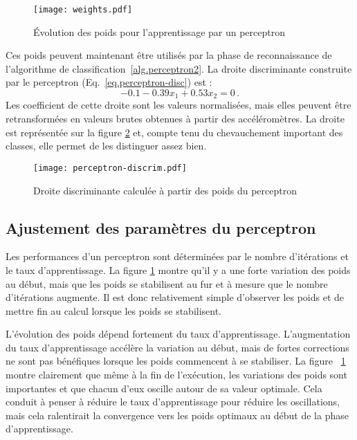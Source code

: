 \begin{figure}[bt]
\begin{center}
\texttt{[image: weights.pdf]}
\end{center}
\caption{Évolution des poids pour l'apprentissage par un perceptron}\label{fig.weights-fixeta}
\end{figure}
Ces poids peuvent maintenant être utilisés par la phase de reconnaissance de l'algorithme de classification~\ref{alg.perceptron2}. La droite discriminante construite par le perceptron (Eq.~\ref{eq.perceptron-disc}) est :
\[
-0.1 -0.39x_1 + 0.53x_2 = 0\,.
\]
Les coefficient de cette droite sont les valeurs normalisées, mais elles peuvent être retransformées en valeurs brutes obtenues à partir des accéléromètres. La droite est représentée sur la figure \ref{fig.perceptron-dis} et, compte tenu du chevauchement important des classes, elle permet de les distinguer assez bien.

\begin{figure}
\begin{center}
\texttt{[image: perceptron-discrim.pdf]}
\end{center}
\caption{Droite discriminante calculée à partir des poids du perceptron}\label{fig.perceptron-dis}
\end{figure}

\subsection{Ajustement des paramètres du perceptron}

Les performances d'un perceptron sont déterminées par le nombre d'itérations et le taux d'apprentissage. La figure \ref{fig.weights-fixeta} montre qu'il y a une forte variation des poids au début, mais que les poids se stabilisent au fur et à mesure que le nombre d'itérations augmente. Il est donc relativement simple d'observer les poids et de mettre fin au calcul lorsque les poids se stabilisent.

L'évolution des poids dépend fortement du taux d'apprentissage. L'augmentation du taux d'apprentissage accélère la variation au début, mais de fortes corrections ne sont pas bénéfiques lorsque les poids commencent à se stabiliser. La figure ~\ref{fig.weights-fixeta} montre clairement que même à la fin de l'exécution, les variations des poids sont importantes et que chacun d'eux oscille autour de sa valeur optimale. Cela conduit à penser à réduire le taux d'apprentissage pour réduire les oscillations, mais cela ralentirait la convergence vers les poids optimaux au début de la phase d'apprentissage.

